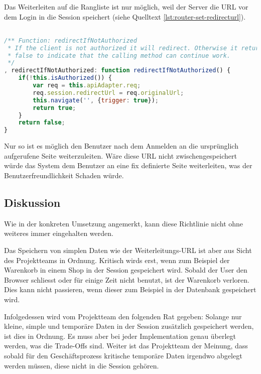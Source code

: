 Das Weiterleiten auf die Rangliste ist nur möglich, weil der Server die \gls{URL} vor dem Login in die Session speichert (siehe Quelltext \ref{lst:router-set-redirecturl}).

\begin{lstlisting}[language=JavaScript, caption=Router - Autorisationskontrolle \cite{roomiesRouter}, label=lst:router-set-redirecturl, firstnumber=225]

/** Function: redirectIfNotAuthorized
 * If the client is not authorized it will redirect. Otherwise it returns
 * false to indicate that the calling method can continue work.
 */
, redirectIfNotAuthorized: function redirectIfNotAuthorized() {
	if(!this.isAuthorized()) {
		var req = this.apiAdapter.req;
		req.session.redirectUrl = req.originalUrl;
		this.navigate('', {trigger: true});
		return true;
	}
	return false;
}
\end{lstlisting}

Nur so ist es möglich den Benutzer nach dem Anmelden an die ursprünglich aufgerufene Seite weiterzuleiten. Wäre diese \gls{URL} nicht zwischengespeichert würde das System dem Benutzer an eine fix definierte Seite weiterleiten, was der Benutzerfreundlichkeit Schaden würde.

\subsection*{Diskussion}
Wie in der konkreten Umsetzung angemerkt, kann diese Richtlinie nicht ohne weiteres immer eingehalten werden.

Das Speichern von simplen Daten wie der Weiterleitungs-\gls{URL} ist aber aus Sicht des Projektteams in Ordnung. Kritisch wirds erst, wenn zum Beispiel der Warenkorb in einem Shop in der Session gespeichert wird. Sobald der User den Browser schliesst oder für einige Zeit nicht benutzt, ist der Warenkorb verloren. Dies kann nicht passieren, wenn dieser zum Beispiel in der Datenbank gespeichert wird.

Infolgedessen wird vom Projektteam den folgenden Rat gegeben: Solange nur kleine, simple und temporäre Daten in der Session zusätzlich gespeichert werden, ist dies in Ordnung. Es muss aber bei jeder Implementation genau überlegt werden, was die Trade-Offs sind.
Weiter ist das Projektteam der Meinung, dass sobald für den Geschäftsprozess kritische temporäre Daten irgendwo abgelegt werden müssen, diese nicht in die Session gehören.